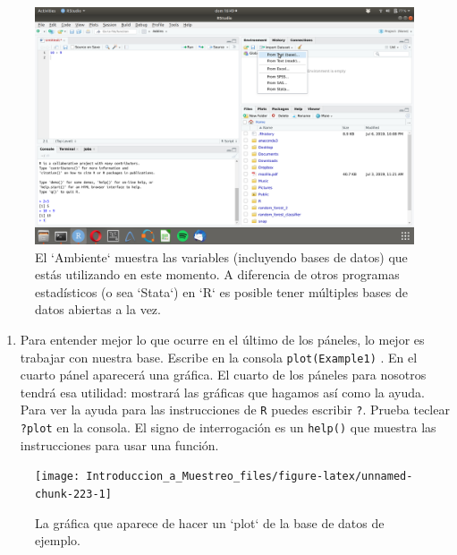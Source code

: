 \documentclass[
]{book}
\providecommand{\tightlist}{%
  \setlength{\itemsep}{0pt}\setlength{\parskip}{0pt}}
\begin{document}
\begin{figure}

{\centering \includegraphics[width=40in]{images/RStudio6} 

}

\caption{El `Ambiente` muestra las variables (incluyendo bases de datos) que estás utilizando en este momento. A diferencia de otros programas estadísticos (o sea `Stata`) en `R` es posible tener múltiples bases de datos abiertas a la vez.}\label{fig:unnamed-chunk-222}
\end{figure}

\begin{enumerate}
\def\labelenumi{\arabic{enumi}.}
\setcounter{enumi}{3}
\tightlist
\item
  Para entender mejor lo que ocurre en el último de los páneles, lo mejor es trabajar con nuestra base. Escribe en la consola \texttt{plot(Example1)} . En el cuarto pánel aparecerá una gráfica. El cuarto de los páneles para nosotros tendrá esa utilidad: mostrará las gráficas que hagamos así como la ayuda. Para ver la ayuda para las instrucciones de \texttt{R} puedes escribir \texttt{?}. Prueba teclear \texttt{?plot} en la consola. El signo de interrogación es un \texttt{help()} que muestra las instrucciones para usar una función.
\end{enumerate}

\begin{figure}

{\centering \texttt{[image: Introduccion\_a\_Muestreo\_files/figure-latex/unnamed-chunk-223-1]} 

}

\caption{La gráfica que aparece de hacer un `plot` de la base de datos de ejemplo.}\label{fig:unnamed-chunk-223}
\end{figure}
\end{document}
